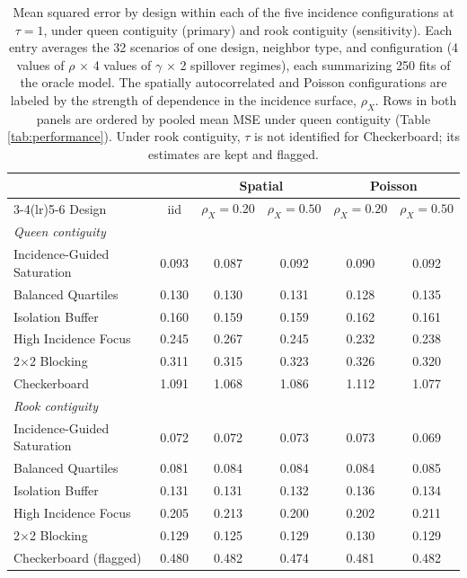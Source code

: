 \documentclass[11pt]{article}
\begin{document}
\begin{table}[!htb]

\small
\centering
\setlength{\tabcolsep}{4pt}

\caption{Mean squared error by design within each of the five incidence configurations at $\tau = 1$, under queen contiguity (primary) and rook contiguity (sensitivity). Each entry averages the 32 scenarios of one design, neighbor type, and configuration (4 values of $\rho$ $\times$ 4 values of $\gamma$ $\times$ 2 spillover regimes), each summarizing 250 fits of the oracle model. The spatially autocorrelated and Poisson configurations are labeled by the strength of dependence in the incidence surface, $\rho_X$. Rows in both panels are ordered by pooled mean MSE under queen contiguity (Table \ref{tab:performance}). Under rook contiguity, $\tau$ is not identified for Checkerboard; its estimates are kept and flagged.}
\label{tab:by-config}

\begin{tabular}{lccccc}

\toprule
& & \multicolumn{2}{c}{Spatial} & \multicolumn{2}{c}{Poisson} \\
\cmidrule(lr){3-4}\cmidrule(lr){5-6}
Design & iid & $\rho_X=0.20$ & $\rho_X=0.50$ & $\rho_X=0.20$ & $\rho_X=0.50$ \\

\midrule
\multicolumn{6}{l}{\textit{Queen contiguity}} \\
Incidence-Guided Saturation & 0.093 & 0.087 & 0.092 & 0.090 & 0.092 \\
Balanced Quartiles & 0.130 & 0.130 & 0.131 & 0.128 & 0.135 \\
Isolation Buffer & 0.160 & 0.159 & 0.159 & 0.162 & 0.161 \\
High Incidence Focus & 0.245 & 0.267 & 0.245 & 0.232 & 0.238 \\
2$\times$2 Blocking & 0.311 & 0.315 & 0.323 & 0.326 & 0.320 \\
Checkerboard & 1.091 & 1.068 & 1.086 & 1.112 & 1.077 \\

\midrule
\multicolumn{6}{l}{\textit{Rook contiguity}} \\
Incidence-Guided Saturation & 0.072 & 0.072 & 0.073 & 0.073 & 0.069 \\
Balanced Quartiles & 0.081 & 0.084 & 0.084 & 0.084 & 0.085 \\
Isolation Buffer & 0.131 & 0.131 & 0.132 & 0.136 & 0.134 \\
High Incidence Focus & 0.205 & 0.213 & 0.200 & 0.202 & 0.211 \\
2$\times$2 Blocking & 0.129 & 0.125 & 0.129 & 0.130 & 0.129 \\
Checkerboard (flagged) & 0.480 & 0.482 & 0.474 & 0.481 & 0.482 \\

\bottomrule

\end{tabular}

\end{table}
\end{document}
